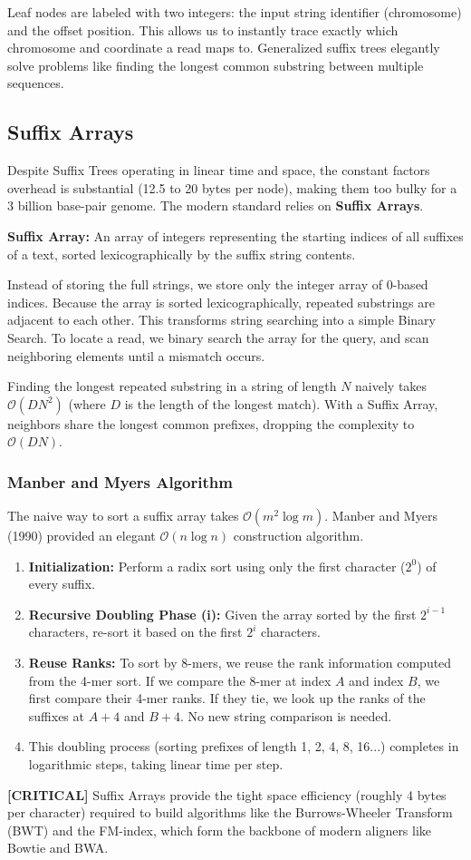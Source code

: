 \documentclass[11pt,a4paper]{article}
\newenvironment{important}{%
    \begin{tcolorbox}[colback=blue!5, colframe=blue!80!black, arc=4mm, boxrule=1pt]
}{%
    \end{tcolorbox}
}
\newcommand{\sta}{\textbf{[CRITICAL] }}
\begin{document}
Leaf nodes are labeled with two integers: the input string identifier (chromosome) and the offset position. This allows us to instantly trace exactly which chromosome and coordinate a read maps to. Generalized suffix trees elegantly solve problems like finding the longest common substring between multiple sequences.

\subsection{Suffix Arrays}
Despite Suffix Trees operating in linear time and space, the constant factors overhead is substantial (12.5 to 20 bytes per node), making them too bulky for a 3 billion base-pair genome. The modern standard relies on \textbf{Suffix Arrays}.

\begin{important}
    \textbf{Suffix Array:} An array of integers representing the starting indices of all suffixes of a text, sorted lexicographically by the suffix string contents.
\end{important}

Instead of storing the full strings, we store only the integer array of 0-based indices. Because the array is sorted lexicographically, repeated substrings are adjacent to each other. 
This transforms string searching into a simple Binary Search. To locate a read, we binary search the array for the query, and scan neighboring elements until a mismatch occurs.

Finding the longest repeated substring in a string of length $N$ naively takes $\mathcal{O}(D N^2)$ (where $D$ is the length of the longest match). With a Suffix Array, neighbors share the longest common prefixes, dropping the complexity to $\mathcal{O}(DN)$.

\subsubsection{Manber and Myers Algorithm}
The naive way to sort a suffix array takes $\mathcal{O}(m^2 \log m)$. Manber and Myers (1990) provided an elegant $\mathcal{O}(n \log n)$ construction algorithm.

\begin{enumerate}
    \item \textbf{Initialization:} Perform a radix sort using only the first character ($2^0$) of every suffix.
    \item \textbf{Recursive Doubling Phase (i):} Given the array sorted by the first $2^{i-1}$ characters, re-sort it based on the first $2^i$ characters. 
    \item \textbf{Reuse Ranks:} To sort by 8-mers, we reuse the rank information computed from the 4-mer sort. If we compare the 8-mer at index $A$ and index $B$, we first compare their 4-mer ranks. If they tie, we look up the ranks of the suffixes at $A+4$ and $B+4$. No new string comparison is needed.
    \item This doubling process (sorting prefixes of length 1, 2, 4, 8, 16...) completes in logarithmic steps, taking linear time per step.
\end{enumerate}

\sta Suffix Arrays provide the tight space efficiency (roughly 4 bytes per character) required to build algorithms like the Burrows-Wheeler Transform (BWT) and the FM-index, which form the backbone of modern aligners like Bowtie and BWA.
\end{document}
